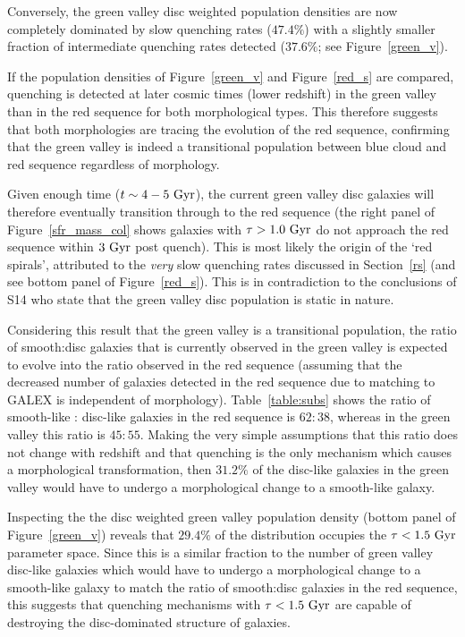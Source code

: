 Conversely, the green valley disc weighted population densities are now completely dominated by slow quenching rates ($47.4\%$) with a slightly smaller fraction of intermediate quenching rates detected ($37.6\%$; see Figure~\ref{green_v}).

If the population densities of Figure~\ref{green_v} and Figure~\ref{red_s} are compared, quenching is detected at later cosmic times (lower redshift) in the green valley than in the red sequence for both morphological types. This therefore suggests that both morphologies are tracing the evolution of the red sequence, confirming that the green valley is indeed a transitional population between blue cloud and red sequence regardless of morphology. 

Given enough time ($t\sim4 - 5~\rm{Gyr}$), the current green valley disc galaxies will therefore eventually transition through to the red sequence (the right panel of Figure~\ref{sfr_mass_col} shows galaxies with $\tau > 1.0~\rm{Gyr}$ do not approach the red sequence within $3~\rm{Gyr}$ post quench). This is most likely the origin of the `red spirals', attributed to the \emph{very} slow quenching rates discussed in Section~\ref{rs} (and see bottom panel of Figure~\ref{red_s}). This is in contradiction to the conclusions of S14 who state that the green valley disc population is static in nature. 

Considering this result that the green valley is a transitional population, the ratio of smooth:disc galaxies that is currently observed in the green valley is expected to evolve into the ratio observed in the red sequence (assuming that the decreased number of galaxies detected in the red sequence due to matching to GALEX is independent of morphology). Table~\ref{table:subs} shows the ratio of smooth-like : disc-like galaxies in the red sequence is $62:38$, whereas in the green valley this ratio is $45:55$. Making the very simple assumptions that this ratio does not change with redshift and that quenching is the only mechanism which causes a morphological transformation, then $31.2\%$ of the disc-like galaxies in the green valley would have to undergo a morphological change to a smooth-like galaxy. 

Inspecting the the disc weighted green valley population density (bottom panel of Figure~\ref{green_v}) reveals that $29.4\%$ of the distribution occupies the $\tau < 1.5 ~\rm{Gyr}$ parameter space. Since this is a similar fraction to the number of green valley disc-like galaxies which would have to undergo a morphological change to a smooth-like galaxy to match the ratio of smooth:disc galaxies in the red sequence, this suggests that quenching mechanisms with $\tau < 1.5 ~\rm{Gyr}$ are capable of destroying the disc-dominated structure of galaxies. 

